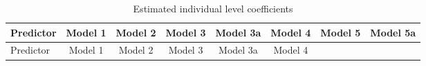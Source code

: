 \documentclass[12pt,twoside]{reedthesis}
\begin{document}
  \begin{longtable}[]{@{}lccccccc@{}}
  \caption{Estimated individual level coefficients
  \label{tab:model_indiv_coef}}\tabularnewline
  \toprule
  \begin{minipage}[b]{0.11\columnwidth}\raggedright\strut
  Predictor\strut
  \end{minipage} & \begin{minipage}[b]{0.08\columnwidth}\centering\strut
  Model 1\strut
  \end{minipage} & \begin{minipage}[b]{0.10\columnwidth}\centering\strut
  Model 2\strut
  \end{minipage} & \begin{minipage}[b]{0.10\columnwidth}\centering\strut
  Model 3\strut
  \end{minipage} & \begin{minipage}[b]{0.10\columnwidth}\centering\strut
  Model 3a\strut
  \end{minipage} & \begin{minipage}[b]{0.10\columnwidth}\centering\strut
  Model 4\strut
  \end{minipage} & \begin{minipage}[b]{0.10\columnwidth}\centering\strut
  Model 5\strut
  \end{minipage} & \begin{minipage}[b]{0.10\columnwidth}\centering\strut
  Model 5a\strut
  \end{minipage}\tabularnewline
  \midrule
  \endfirsthead
  \toprule
  \begin{minipage}[b]{0.11\columnwidth}\raggedright\strut
  Predictor\strut
  \end{minipage} & \begin{minipage}[b]{0.08\columnwidth}\centering\strut
  Model 1\strut
  \end{minipage} & \begin{minipage}[b]{0.10\columnwidth}\centering\strut
  Model 2\strut
  \end{minipage} & \begin{minipage}[b]{0.10\columnwidth}\centering\strut
  Model 3\strut
  \end{minipage} & \begin{minipage}[b]{0.10\columnwidth}\centering\strut
  Model 3a\strut
  \end{minipage} & \begin{minipage}[b]{0.10\columnwidth}\centering\strut
  Model 4\strut
  \end{minipage} & \begin{minipage}[b]{0.10\columnwidth}\centering\strut

\end{minipage}
\end{longtable}
\end{document}
